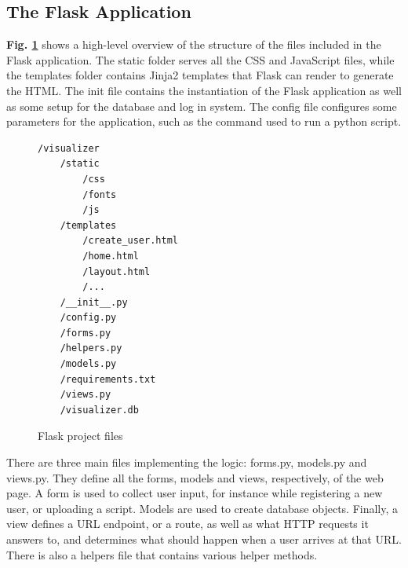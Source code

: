 
\subsection{The Flask Application}

\textbf{Fig. \ref{struct}} shows a high-level overview of the structure of the files included in the Flask application. The static folder serves all the CSS and JavaScript files, while the templates folder contains Jinja2 templates that Flask can render to generate the HTML. The init file contains the instantiation of the Flask application as well as some setup for the database and log in system. The config file configures some parameters for the application, such as the command used to run a python script.\\

\begin{figure}[ht]
\begin{verbatim}
/visualizer
    /static
        /css
        /fonts
        /js
    /templates
        /create_user.html
        /home.html
        /layout.html
        /...
    /__init__.py
    /config.py
    /forms.py
    /helpers.py
    /models.py
    /requirements.txt
    /views.py
    /visualizer.db
\end{verbatim}
\caption{Flask project files}
\label{struct}
\end{figure}

\noindent There are three main files implementing the logic: forms.py, models.py and views.py. They define all the forms, models and views, respectively, of the web page. A form is used to collect user input, for instance while registering a new user, or uploading a script. Models are used to create database objects. Finally, a view defines a URL endpoint, or a route, as well as what HTTP requests it answers to, and determines what should happen when a user arrives at that URL. There is also a helpers file that contains various helper methods.\\

